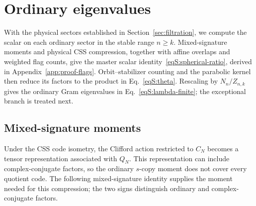 \documentclass[journal,twocolumn]{IEEEtran}
\theoremstyle{definition}
\theoremstyle{plain}
\begin{document}
\section{Ordinary eigenvalues}
\label{sec:ordinary}
With the physical sectors established in Section~\ref{sec:filtration},
we compute the scalar on each ordinary sector in the stable range
$n\geq k$.  Mixed-signature moments and physical CSS compression,
together with affine overlaps and weighted flag counts, give the master
scalar identity~\eqref{eqS:spherical-ratio}, derived in
Appendix~\ref{app:proof-flags}.  Orbit--stabilizer counting
and the parabolic kernel then reduce its factors to the product in
Eq.~\eqref{eqS:theta}.  Rescaling by $N_n/Z_{n,k}$ gives the ordinary
Gram eigenvalues in Eq.~\eqref{eqS:lambda-finite}; the exceptional branch
is treated next.

\subsection{Mixed-signature moments}
Under the CSS code isometry, the Clifford action restricted to $C_N$
becomes a tensor representation associated with $Q_N$.  This
representation can include complex-conjugate factors, so the ordinary
$s$-copy moment does not cover every quotient code.  The following
mixed-signature identity supplies the moment needed for this compression;
the two signs distinguish ordinary and complex-conjugate factors.
\end{document}
